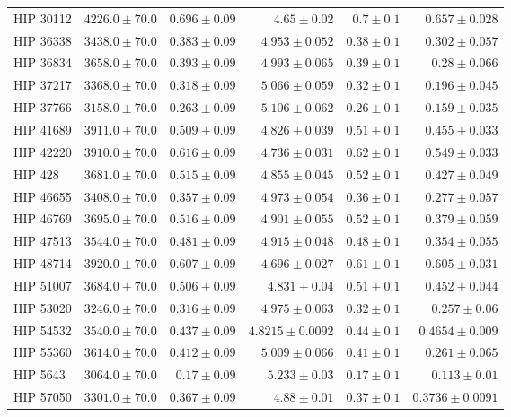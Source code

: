 \begin{longtable*}{lrrrrr}
HIP 30112 & $4226.0\pm 70.0$ & $0.696\pm 0.09$ & $4.65\pm 0.02$ & $0.7\pm 0.1$ & $0.657\pm 0.028$ \\ 
HIP 36338 & $3438.0\pm 70.0$ & $0.383\pm 0.09$ & $4.953\pm 0.052$ & $0.38\pm 0.1$ & $0.302\pm 0.057$ \\ 
HIP 36834 & $3658.0\pm 70.0$ & $0.393\pm 0.09$ & $4.993\pm 0.065$ & $0.39\pm 0.1$ & $0.28\pm 0.066$ \\ 
HIP 37217 & $3368.0\pm 70.0$ & $0.318\pm 0.09$ & $5.066\pm 0.059$ & $0.32\pm 0.1$ & $0.196\pm 0.045$ \\ 
HIP 37766 & $3158.0\pm 70.0$ & $0.263\pm 0.09$ & $5.106\pm 0.062$ & $0.26\pm 0.1$ & $0.159\pm 0.035$ \\ 
HIP 41689 & $3911.0\pm 70.0$ & $0.509\pm 0.09$ & $4.826\pm 0.039$ & $0.51\pm 0.1$ & $0.455\pm 0.033$ \\ 
HIP 42220 & $3910.0\pm 70.0$ & $0.616\pm 0.09$ & $4.736\pm 0.031$ & $0.62\pm 0.1$ & $0.549\pm 0.033$ \\ 
HIP 428 & $3681.0\pm 70.0$ & $0.515\pm 0.09$ & $4.855\pm 0.045$ & $0.52\pm 0.1$ & $0.427\pm 0.049$ \\ 
HIP 46655 & $3408.0\pm 70.0$ & $0.357\pm 0.09$ & $4.973\pm 0.054$ & $0.36\pm 0.1$ & $0.277\pm 0.057$ \\ 
HIP 46769 & $3695.0\pm 70.0$ & $0.516\pm 0.09$ & $4.901\pm 0.055$ & $0.52\pm 0.1$ & $0.379\pm 0.059$ \\ 
HIP 47513 & $3544.0\pm 70.0$ & $0.481\pm 0.09$ & $4.915\pm 0.048$ & $0.48\pm 0.1$ & $0.354\pm 0.055$ \\ 
HIP 48714 & $3920.0\pm 70.0$ & $0.607\pm 0.09$ & $4.696\pm 0.027$ & $0.61\pm 0.1$ & $0.605\pm 0.031$ \\ 
HIP 51007 & $3684.0\pm 70.0$ & $0.506\pm 0.09$ & $4.831\pm 0.04$ & $0.51\pm 0.1$ & $0.452\pm 0.044$ \\ 
HIP 53020 & $3246.0\pm 70.0$ & $0.316\pm 0.09$ & $4.975\pm 0.063$ & $0.32\pm 0.1$ & $0.257\pm 0.06$ \\ 
HIP 54532 & $3540.0\pm 70.0$ & $0.437\pm 0.09$ & $4.8215\pm 0.0092$ & $0.44\pm 0.1$ & $0.4654\pm 0.009$ \\ 
HIP 55360 & $3614.0\pm 70.0$ & $0.412\pm 0.09$ & $5.009\pm 0.066$ & $0.41\pm 0.1$ & $0.261\pm 0.065$ \\ 
HIP 5643 & $3064.0\pm 70.0$ & $0.17\pm 0.09$ & $5.233\pm 0.03$ & $0.17\pm 0.1$ & $0.113\pm 0.01$ \\ 
HIP 57050 & $3301.0\pm 70.0$ & $0.367\pm 0.09$ & $4.88\pm 0.01$ & $0.37\pm 0.1$ & $0.3736\pm 0.0091$ \\ 

\end{longtable*}
